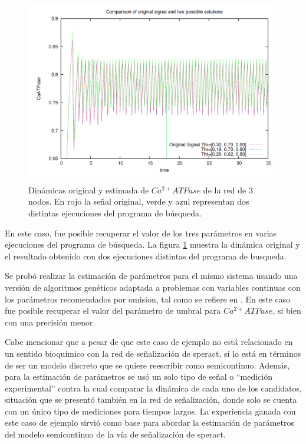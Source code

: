 \begin{figure}[hbt]
\includegraphics[width=0.9\linewidth]{gfx/comparacion3Nodos}
\caption[Dinámicas original y estimada $Ca^{2+}ATPase$]{Dinámicas original y estimada de $Ca^{2+}ATPase$ de la red de 3 nodos. En rojo la señal original, verde y azul representan dos distintas ejecuciones del programa de búsqueda.}\label{fig:resultadoChido3Nodos}
\end{figure}

En este caso, fue posible recuperar el valor de los tres parámetros en varias ejecuciones del programa de búsqueda. La figura \ref{fig:resultadoChido3Nodos} muestra la dinámica original y el resultado obtenido con dos ejecuciones distintas del programa de busqueda.

Se probó realizar la estimación de parámetros para el mismo sistema usando una versión de algoritmos genéticos adaptada a problemas con variables continuas con los parámetros recomendados por omision, tal como se refiere en \citeauthor{Haupt1998} \citep{Haupt1998}. En este caso fue posible recuperar el valor del parámetro de umbral para $Ca^{2+}ATPase$, si bien con una precisión menor.

Cabe mencionar que a pesar de que este caso de ejemplo no está relacionado en un sentido bioquímico con la red de señalización de speract, sí lo está en términos de ser un modelo discreto que se quiere reescribir como semicontinuo. Además, para la estimación de parámetros se usó un solo tipo de señal o ``medición experimental'' contra la cual comparar la dinámica de cada uno de los candidatos, situación que se presentó también en la red de señalización, donde solo se cuenta con un único tipo de mediciones para tiempos largos. La experiencia ganada con este caso de ejemplo sirvió como base para abordar la estimación de parámetros del modelo semicontinuo de la vía de señalización de speract.

